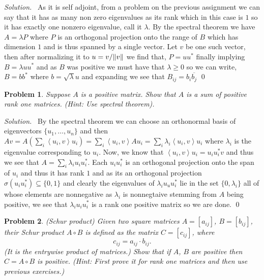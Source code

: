\documentclass[12pt,a4paper]{article}
\newenvironment{solution}{%
  \par\noindent\textit{Solution.}\ }{\qed}
\theoremstyle{problemstyle}
\newtheorem{problem}{Problem}[section]
\newcommand{\ipp}[1]{\left\langle#1\right\rangle}
\begin{document}
\begin{solution}
   As it is self adjoint, from a problem on the previous assignment we can say that it has as many non zero eigenvalues as its rank which in this case is $1$ so it has exactly one nonzero eigenvalue, call it $\lambda$. 
   By the spectral theorem we have $A=\lambda P$ where $P$ is an orthogonal projection onto the range of $B$ which has dimension $1$ and is thus spanned by a single vector. 
   Let $v$ be one such vector, then after normalizing it to $u=v/\norm{v}$ we find that, $P=uu^*$ finally implying $B=\lambda uu^*$ and as $B$ was positive we must have that $\lambda\geq 0$ so we can write, $B=bb^*$ where $b=\sqrt{\lambda}u$ and expanding we see that $B_{ij}=b_i\overline{b_j}$
\end{solution}
\begin{problem}\label{prob:4-4}
Suppose $A$ is a positive matrix. Show that $A$ is a sum of positive rank one matrices. (Hint: Use spectral theorem).
\end{problem}
\begin{solution}
	By the spectral theorem we can choose an orthonormal basis of eigenvectors $\{u_1,\ldots,u_n\}$ and then $Av=A(\sum_i\ipp{u_i,v}u_i)=\sum_i\ipp{u_i,v}Au_i=\sum_i\lambda_i\ipp{u_i,v}u_i$ where $\lambda_i$ is the eigenvalue corresponding to $u_i$. 
	Now, we know that $\ipp{u_i,v}u_i=u_iu_i^*v$ and thus we see that $A=\sum_i\lambda_iu_iu_i^*$. 
	Each $u_iu_i^*$ is an orthogonal projection onto the span of $u_i$ and thus it has rank $1$ and as its an orthogonal projection $\sigma(u_iu_i^*)\subseteq\{0,1\}$ and clearly the eigenvalues of $\lambda_iu_uu_i^*$ lie in the set $\{0,\lambda_i\}$ all of whose elements are nonnegative as $\lambda_i$ is nonnegtaive stemming from $A$ being positive, we see that $\lambda_iu_iu_i^*$ is a rank one positive matrix so we are done.
\end{solution}
\begin{problem}\label{prob:4-5}
(Schur product) Given two square matrices $A = [a_{ij}]$, $B = [b_{ij}]$, their Schur product $A \circ B$ is defined as the matrix $C = [c_{ij}]$, where
\[
c_{ij} = a_{ij} \cdot b_{ij}.
\]
(It is the entrywise product of matrices.) Show that if $A$, $B$ are positive then $C = A \circ B$ is positive. (Hint: First prove it for rank one matrices and then use previous exercises.)
\end{problem}
\end{document}
